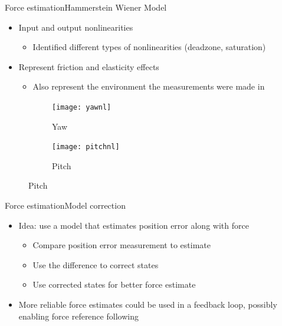 \begin{frame}{Force estimation}{Hammerstein Wiener Model}
\begin{itemize}
  \item Input and output nonlinearities
  \begin{itemize}
    \item Identified different types of nonlinearities (deadzone, saturation)
  \end{itemize}  
  \item Represent friction and elasticity effects
  \begin{itemize}
  	\item Also represent the environment the measurements were made in
  \end{itemize}
\end{itemize}

\begin{figure}
\centering
    \begin{subfigure}[t]{0.49\textwidth}
        \centering
        \texttt{[image: yawnl]} 
        \caption{Yaw} \label{fig:yawresnl}
    \end{subfigure}
        \begin{subfigure}[t]{0.49\textwidth}
        \centering
        \texttt{[image: pitchnl]} 
        \caption{Pitch} \label{fig:pitchresnl}
    \end{subfigure}
\end{figure}
\end{frame}



\begin{frame}{Force estimation}{Model correction}
\begin{itemize}
\item Idea: use a model that estimates position error along with force
\begin{itemize}
\item Compare position error measurement to estimate
\item Use the difference to correct states 
\item Use corrected states for better force estimate
\end{itemize}
\item More reliable force estimates could be used in a feedback loop, possibly enabling force reference following
\end{itemize}


\end{frame}

